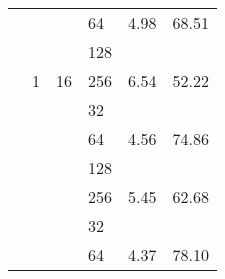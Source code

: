 \begin{longtable}{cccccc}
                      & {  }                                            & {  }                                            & \multicolumn{1}{l}{64}                          & {  4.98}                             & {  68.51}                            \\
                      & {  }                                            & {  }                                            & \multicolumn{1}{l}{\cellcolor[HTML]{EFEFEF}128} & \cellcolor[HTML]{EFEFEF}{  5.40}     & \cellcolor[HTML]{EFEFEF}{  63.20}    \\
                      & \multirow{-4}{*}{{  1}}                         & \multirow{-4}{*}{{  16}}                        & \multicolumn{1}{l}{256}                         & {  6.54}                             & {  52.22}                            \\ \cline{2-6}
                      & \cellcolor[HTML]{EFEFEF}{  }                    & \cellcolor[HTML]{EFEFEF}{  }                    & \multicolumn{1}{l}{\cellcolor[HTML]{EFEFEF}32}  & \cellcolor[HTML]{EFEFEF}{  4.91}     & \cellcolor[HTML]{EFEFEF}{  69.48}    \\
                      & \cellcolor[HTML]{EFEFEF}{  }                    & \cellcolor[HTML]{EFEFEF}{  }                    & \multicolumn{1}{l}{64}                          & {  4.56}                             & {  74.86}                            \\
                      & \cellcolor[HTML]{EFEFEF}{  }                    & \cellcolor[HTML]{EFEFEF}{  }                    & \multicolumn{1}{l}{\cellcolor[HTML]{EFEFEF}128} & \cellcolor[HTML]{EFEFEF}{  4.72}     & \cellcolor[HTML]{EFEFEF}{  72.41}    \\
                      & \multirow{-4}{*}{\cellcolor[HTML]{EFEFEF}{  2}}  & \multirow{-4}{*}{\cellcolor[HTML]{EFEFEF}{  8}} & \multicolumn{1}{l}{256}                         & {  5.45}                             & {  62.68}                            \\ \cline{2-6}
                      & {  }                                            & {  }                                            & \multicolumn{1}{l}{\cellcolor[HTML]{EFEFEF}32}  & \cellcolor[HTML]{EFEFEF}{  4.94}     & \cellcolor[HTML]{EFEFEF}{  69.21}    \\
                      & {  }                                            & {  }                                            & \multicolumn{1}{l}{64}                          & {  4.37}                             & {  78.10}                            \\

\end{longtable}
